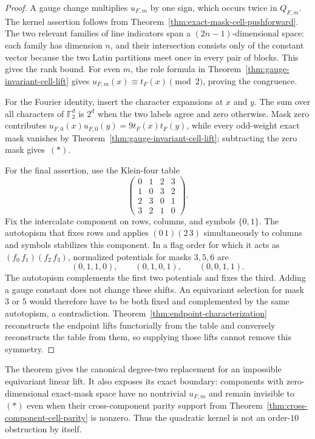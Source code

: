 \begin{proof}
A gauge change multiplies $u_{F,m}$ by one sign, which occurs twice in
$Q_{F,m}$.  The kernel assertion follows from
Theorem~\ref{thm:exact-mask-cell-pushforward}.  The two relevant families of
line indicators span a $(2n-1)$-dimensional space: each family has dimension
$n$, and their intersection consists only of the constant vector because the
two Latin partitions meet once in every pair of blocks.  This gives the rank
bound.  For even $m$, the role formula in
Theorem~\ref{thm:gauge-invariant-cell-lift} gives
$u_{F,m}(x)\equiv t_F(x)\pmod2$, proving the congruence.

For the Fourier identity, insert the character expansions at $x$ and $y$.
The sum over all characters of $\mathbb F_2^d$ is $2^d$ when the two labels
agree and zero otherwise.  Mask zero contributes
$u_{F,0}(x)u_{F,0}(y)=9t_F(x)t_F(y)$, while every odd-weight exact mask
vanishes by Theorem~\ref{thm:gauge-invariant-cell-lift}; subtracting the zero
mask gives~$(*)$.

For the final assertion, use the Klein-four table
\[
\begin{pmatrix}
0&1&2&3\\1&0&3&2\\2&3&0&1\\3&2&1&0
\end{pmatrix}.
\]
Fix the intercalate component on rows, columns, and symbols $\{0,1\}$.
The autotopism that fixes rows and applies $(0\,1)(2\,3)$ simultaneously to
columns and symbols stabilizes this component.  In a flag order for which it
acts as $(f_0\,f_1)(f_2\,f_3)$, normalized potentials for masks $3,5,6$ are
\[
 (0,1,1,0),\qquad(0,1,0,1),\qquad(0,0,1,1).
\]
The autotopism complements the first two potentials and fixes the third.
Adding a gauge constant does not change these shifts.  An equivariant
selection for mask $3$ or $5$ would therefore have to be both fixed and
complemented by the same autotopism, a contradiction.
Theorem~\ref{thm:endpoint-characterization} reconstructs the
endpoint lifts functorially from the table and conversely reconstructs the
table from them, so supplying those lifts cannot remove this symmetry.
\end{proof}

The theorem gives the canonical degree-two replacement for an impossible
equivariant linear lift.  It also exposes its exact boundary: components with
zero-dimensional exact-mask space have no nontrivial $u_{F,m}$ and remain
invisible to~$(*)$ even when their cross-component parity support from
Theorem~\ref{thm:cross-component-cell-parity} is nonzero.  Thus the
quadratic kernel is not an order-$10$ obstruction by itself.

